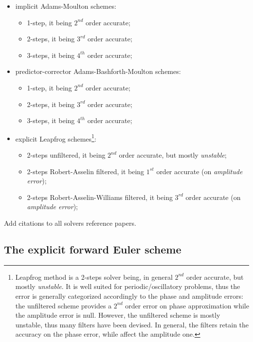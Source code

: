 \documentclass[pdftex,preprint,3p,times,numbers]{elsarticle}
\begin{document}
\begin{itemize}
\begin{itemize}
\begin{itemize}
          \end{itemize}
      \item implicit Adams-Moulton schemes:
        \begin{itemize}
          \item 1-step, it being $2^{nd}$ order accurate;
          \item 2-steps, it being $3^{rd}$ order accurate;
          \item 3-steps, it being $4^{th}$ order accurate;
          \end{itemize}
      \item predictor-corrector Adams-Bashforth-Moulton schemes:
        \begin{itemize}
          \item 1-step, it being $2^{nd}$ order accurate;
          \item 2-steps, it being $3^{rd}$ order accurate;
          \item 3-steps, it being $4^{th}$ order accurate;
          \end{itemize}
      \item explicit Leapfrog schemes\footnote{Leapfrog method is a 2-steps solver being, in general $2^{nd}$ order accurate, but mostly \emph{unstable}. It is well suited for periodic/oscillatory problems, thus the error is generally categorized accordingly to the phase and amplitude errors: the unfiltered scheme provides a $2^{nd}$ order error on phase approximation while the amplitude error is null. However, the unfiltered scheme is mostly unstable, thus many filters have been devised. In general, the filters retain the accuracy on the phase error, while affect the amplitude one.}:
        \begin{itemize}
          \item 2-steps unfiltered, it being $2^{nd}$ order accurate, but mostly \emph{unstable};
          \item 2-steps Robert-Asselin filtered, it being $1^{st}$ order accurate (on \emph{amplitude error});
          \item 2-steps Robert-Asselin-Williams filtered, it being $3^{rd}$ order accurate (on \emph{amplitude error});
          \end{itemize}
      \end{itemize}
  \end{itemize}

{\color{red} Add citations to all solvers reference papers.}

\subsection{The explicit forward Euler scheme}
\end{document}
